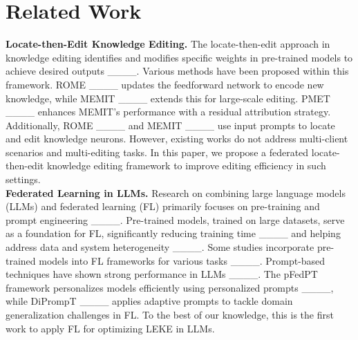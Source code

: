 \section{Related Work}
\textbf{Locate-then-Edit Knowledge Editing.} 
The locate-then-edit approach in knowledge editing identifies and modifies specific weights in pre-trained models to achieve desired outputs ____. Various methods have been proposed within this framework. ROME ____ updates the feedforward network to encode new knowledge, while MEMIT ____ extends this for large-scale editing. PMET ____ enhances MEMIT’s performance with a residual attribution strategy. Additionally, ROME ____ and MEMIT ____ use input prompts to locate and edit knowledge neurons. However, existing works do not address multi-client scenarios and multi-editing tasks. In this paper, we propose a federated locate-then-edit knowledge editing framework to improve editing efficiency in such settings. \\
\textbf{Federated Learning in LLMs.}
Research on combining large language models (LLMs) and federated learning (FL) primarily focuses on pre-training and prompt engineering ____. Pre-trained models, trained on large datasets, serve as a foundation for FL, significantly reducing training time ____ and helping address data and system heterogeneity ____. Some studies incorporate pre-trained models into FL frameworks for various tasks ____. Prompt-based techniques have shown strong performance in LLMs ____. The pFedPT framework personalizes models efficiently using personalized prompts ____, while DiPrompT ____ applies adaptive prompts to tackle domain generalization challenges in FL. To the best of our knowledge, this is the first work to apply FL for optimizing LEKE in LLMs.